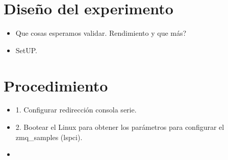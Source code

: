    \section{Diseño del experimento}
    \begin{itemize}
        \item Que cosas esperamos validar. Rendimiento y que más?
        \item SetUP.
    \end{itemize}
    \section{Procedimiento}
    \begin{itemize}
        \item 1. Configurar redirección consola serie.
        \item 2. Bootear el Linux para obtener los parámetros para configurar el zmq\_samples (lspci).
        \item 
    \end{itemize}